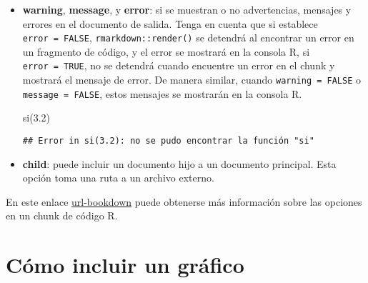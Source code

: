 \documentclass[12pt,a4paper,]{book}
\newenvironment{Shaded}{\begin{snugshade}}{\end{snugshade}}
\newcommand{\FloatTok}[1]{\textcolor[rgb]{0.00,0.00,0.81}{#1}}
\newcommand{\FunctionTok}[1]{\textcolor[rgb]{0.00,0.00,0.00}{#1}}
\newcommand{\NormalTok}[1]{#1}
\newcommand{\SpecialCharTok}[1]{\textcolor[rgb]{0.00,0.00,0.00}{#1}}
\newcommand{\StringTok}[1]{\textcolor[rgb]{0.31,0.60,0.02}{#1}}
\numberwithin{dummy}{section}
\theoremstyle{ocrenumbox}
\theoremstyle{blacknumex}
\theoremstyle{blacknumbox}
\theoremstyle{ocrenum}
\theoremstyle{ocrenum}
\newenvironment{markdownsal}{\begin{mBox}}{\end{mBox}}
\newcommand{\bmarkdownsal}{\begin{markdownsal}}
\newcommand{\emarkdownsal}{\end{markdownsal}}
\begin{document}
\begin{itemize}
\item
  \textbf{warning}, \textbf{message}, y \textbf{error}: si se muestran o
  no advertencias, mensajes y errores en el documento de salida. Tenga
  en cuenta que si establece \texttt{error\ =\ FALSE},
  \texttt{rmarkdown::render()} se detendrá al encontrar un error en un
  fragmento de código, y el error se mostrará en la consola R, si
  \texttt{error\ =\ TRUE}, no se detendrá cuando encuentre un error en
  el chunk y mostrará el mensaje de error. De manera similar, cuando
  \texttt{warning\ =\ FALSE} o \texttt{message\ =\ FALSE}, estos
  mensajes se mostrarán en la consola R.

  \bmarkdownsal

\begin{Shaded}
\begin{Highlighting}[]
\FunctionTok{si}\NormalTok{(}\FloatTok{3.2}\NormalTok{)}
\end{Highlighting}
\end{Shaded}

\begin{verbatim}
## Error in si(3.2): no se pudo encontrar la función "si"
\end{verbatim}

  \emarkdownsal
\item
  \textbf{child}: puede incluir un documento hijo a un documento
  principal. Esta opción toma una ruta a un archivo externo.
\end{itemize}

En este enlace
\href{https://bookdown.org/yihui/rmarkdown/r-code.html}{url-bookdown}
puede obtenerse más información sobre las opciones en un chunk de código
R.

\hypertarget{sec:incluirgrafico}{%
\section{Cómo incluir un gráfico}\label{sec:incluirgrafico}}
\end{document}
